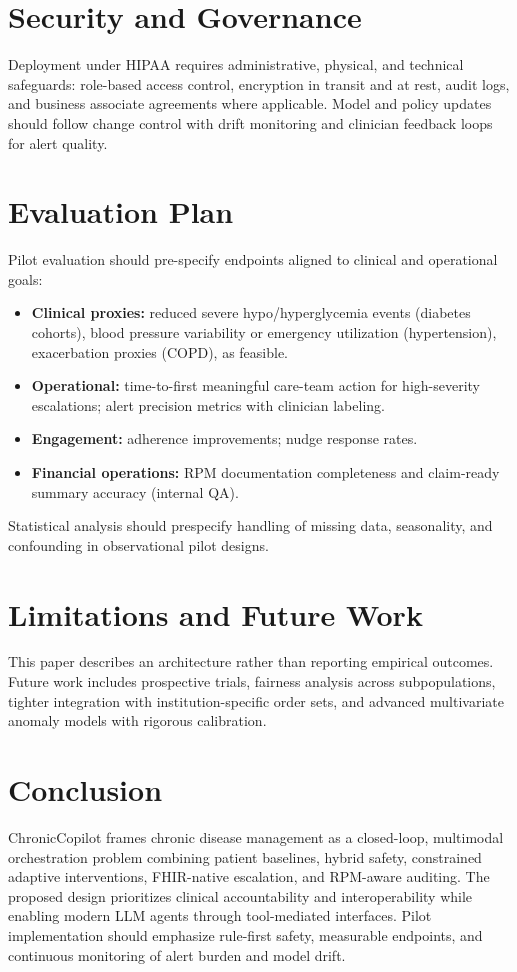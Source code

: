 \documentclass[conference]{IEEEtran}
\begin{document}
\section{Security and Governance}
Deployment under HIPAA requires administrative, physical, and technical safeguards: role-based access control, encryption in transit and at rest, audit logs, and business associate agreements where applicable. Model and policy updates should follow change control with drift monitoring and clinician feedback loops for alert quality.

\section{Evaluation Plan}
Pilot evaluation should pre-specify endpoints aligned to clinical and operational goals:
\begin{itemize}
  \item \textbf{Clinical proxies:} reduced severe hypo/hyperglycemia events (diabetes cohorts), blood pressure variability or emergency utilization (hypertension), exacerbation proxies (COPD), as feasible.
  \item \textbf{Operational:} time-to-first meaningful care-team action for high-severity escalations; alert precision metrics with clinician labeling.
  \item \textbf{Engagement:} adherence improvements; nudge response rates.
  \item \textbf{Financial operations:} RPM documentation completeness and claim-ready summary accuracy (internal QA).
\end{itemize}
Statistical analysis should prespecify handling of missing data, seasonality, and confounding in observational pilot designs.

\section{Limitations and Future Work}
This paper describes an architecture rather than reporting empirical outcomes. Future work includes prospective trials, fairness analysis across subpopulations, tighter integration with institution-specific order sets, and advanced multivariate anomaly models with rigorous calibration.

\section{Conclusion}
ChronicCopilot frames chronic disease management as a closed-loop, multimodal orchestration problem combining patient baselines, hybrid safety, constrained adaptive interventions, FHIR-native escalation, and RPM-aware auditing. The proposed design prioritizes clinical accountability and interoperability while enabling modern LLM agents through tool-mediated interfaces. Pilot implementation should emphasize rule-first safety, measurable endpoints, and continuous monitoring of alert burden and model drift.
\end{document}
